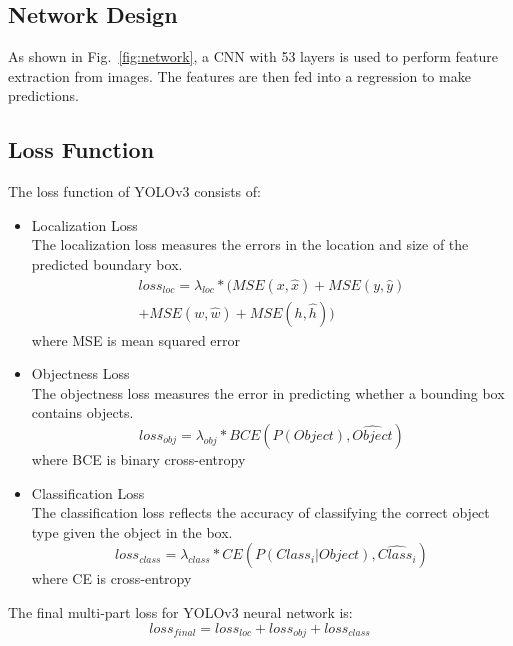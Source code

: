 \documentclass[letterpaper]{article} %
\begin{document}
\subsection{Network Design}
As shown in Fig.~\ref{fig:network}, a CNN with 53 layers is used to perform feature extraction from images. The features are then fed into a regression to make predictions. 

\subsection{Loss Function}
The loss function of YOLOv3 consists of:
\begin{itemize}
    \item Localization Loss\\
    The localization loss measures the errors in the location and size of the predicted boundary box.
\begin{equation}
\begin{aligned}
loss_{loc} = \lambda_{loc}*(MSE(x, \hat{x})+MSE(y, \hat{y})\\+MSE(w, \hat{w})+MSE(h, \hat{h}))
\end{aligned}
\end{equation}
\scriptsize
where MSE is mean squared error
\normalsize
 \item Objectness Loss\\
    The objectness loss measures the error in predicting whether a bounding box contains objects.
    \begin{equation}
   loss_{obj} = \lambda_{obj}*BCE(P(Object), \hat{Object})
   \end{equation}
   \scriptsize
where BCE is binary cross-entropy
\normalsize

    \item Classification Loss\\
    The classification loss reflects the accuracy of classifying the correct object type given the object in the box.
    \begin{equation}
    loss_{class} = \lambda_{class}*CE(P(Class_{i}|Object), \hat{Class_i})
    \end{equation}
    \scriptsize
where CE is cross-entropy
\normalsize
\end{itemize}
The final multi-part loss for YOLOv3 neural network is:
\begin{equation}
loss_{final} = loss_{loc} + loss_{obj} + loss_{class}
\end{equation}
\end{document}
